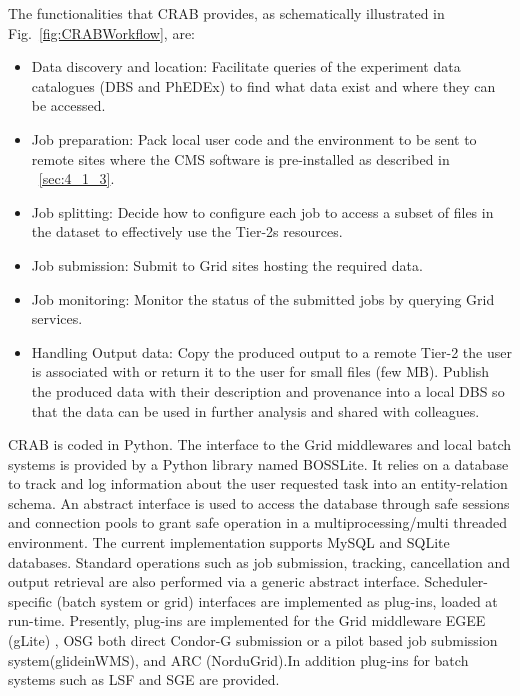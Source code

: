 The functionalities that CRAB provides, as schematically illustrated in Fig.~\ref{fig:CRABWorkflow}, are:
\begin{itemize}
\item{Data discovery and location:}
Facilitate queries of the experiment data catalogues (DBS and PhEDEx) to find 
what data exist and where they can be accessed.
\item{Job preparation:}
Pack local user code and the environment to be sent to remote sites where the CMS software is pre-installed as described in ~\ref{sec:4_1_3}.
\item{Job splitting:}
Decide how to configure each job to access a subset of files in the dataset to effectively use the Tier-2s resources.
\item{Job submission:}
Submit to Grid sites hosting the required data.
\item{Job monitoring:}
Monitor the status of the submitted jobs by querying Grid services.
\item{Handling Output data:}
Copy the produced output to a remote Tier-2 the user is associated with or return it to the user for small files (few MB).
Publish the produced data with their description and provenance into a local DBS so that the data can be used in further analysis and shared with colleagues.
\end{itemize} 

CRAB is coded in Python. The interface to the Grid middlewares and local batch systems is provided by a Python library named BOSSLite\cite{RefBOSSLite}. It relies on a database to track and log information about the user requested task into an entity-relation schema.
An abstract interface is used to access the database through safe sessions and connection pools to grant safe operation in a multiprocessing/multi threaded environment. The current implementation supports MySQL and SQLite databases.
Standard operations such as job submission, tracking, cancellation and output retrieval are also performed via a generic abstract interface. Scheduler-specific (batch system or grid) interfaces are implemented as plug-ins, loaded at run-time. Presently, plug-ins are implemented for the Grid middleware EGEE (gLite) \cite{RefgLiteWMS}, OSG \cite{RefOSG} both direct Condor-G submission or a pilot based job submission system(glideinWMS\cite{Refglidein}), and ARC (NorduGrid)\cite{RefARC}.In addition plug-ins for batch systems such as LSF and SGE are provided.

